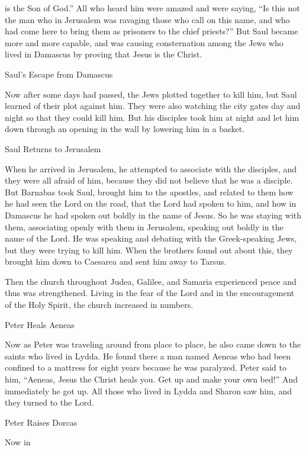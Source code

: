 {is
the Son
of God.”
All
who heard
him were amazed
and
were saying,
“Is this
not
the man
who in
Jerusalem
was ravaging
those who call on
this
name,
and
who had come
here
to
bring
them
as prisoners
to
the chief priests?”
But
Saul
became more and more
capable,
and
was causing consternation
among the Jews
who lived
in
Damascus
by proving
that
Jesus
is
the Christ.
\par }{\SH Saul’s Escape from Damascus
\par }{\PP {}Now after some
days
had passed,
the Jews
plotted together
to kill
him,
but
Saul
learned
of their plot
against him.
They were
also
watching
the city gates
day
and
night
so that
they could kill
him.
But
his
disciples
took
him at night
and let
him
down
through
an opening in the wall
by lowering
him in
a basket.
\par }{\SH Saul Returns to Jerusalem
\par }{\PP {}When he arrived
in
Jerusalem,
he attempted
to associate
with the disciples,
and
they were
all
afraid
of him,
because they did
not
believe
that
he was
a disciple.
But
Barnabas
took
Saul,
brought
him to
the apostles,
and
related
to them
how
he had seen
the Lord
on
the road,
that
the Lord had spoken
to him,
and
how
in
Damascus
he had spoken out boldly
in
the name
of Jesus.
So
he was
staying
with
them,
associating openly
with them in
Jerusalem,
speaking out boldly
in
the name
of the Lord.
He was speaking
and
debating
with
the Greek-speaking Jews,
but
they were trying
to kill
him.
When
the brothers
found out
about this, they brought
him
down
to
Caesarea
and
sent
him
away
to
Tarsus.
\par }{\PP {}Then
the church
throughout
Judea,
Galilee,
and
Samaria
experienced
peace
and
thus was strengthened. Living
in the fear
of the Lord
and
in the encouragement
of the Holy
Spirit,
the church increased in numbers.
\par }{\SH Peter Heals Aeneas
\par }{\PP {}Now as
Peter
was traveling around
from place to place,
he also
came down
to
the saints
who lived
in Lydda.
He found
there
a man
named
Aeneas
who had been confined
to
a mattress
for
eight
years
because he was
paralyzed.
Peter
said
to him,
“Aeneas,
Jesus
the Christ
heals
you.
Get up
and
make
your own bed!” And
immediately
he got up.
All those
who lived
in Lydda
and
Sharon
saw
him,
and they turned
to
the Lord.
\par }{\SH Peter Raises Dorcas
\par }{\PP {}Now in
}
